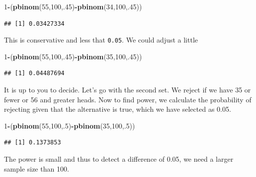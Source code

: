 \documentclass[]{book}
\newenvironment{Shaded}{\begin{snugshade}}{\end{snugshade}}
\newcommand{\KeywordTok}[1]{\textcolor[rgb]{0.13,0.29,0.53}{\textbf{#1}}}
\newcommand{\DecValTok}[1]{\textcolor[rgb]{0.00,0.00,0.81}{#1}}
\newcommand{\OperatorTok}[1]{\textcolor[rgb]{0.81,0.36,0.00}{\textbf{#1}}}
\newcommand{\NormalTok}[1]{#1}
\theoremstyle{definition}
\theoremstyle{definition}
\theoremstyle{definition}
\theoremstyle{remark}
\begin{document}
\begin{Shaded}
\begin{Highlighting}[]
\DecValTok{1}\OperatorTok{-}\NormalTok{(}\KeywordTok{pbinom}\NormalTok{(}\DecValTok{55}\NormalTok{,}\DecValTok{100}\NormalTok{,.}\DecValTok{45}\NormalTok{)}\OperatorTok{-}\KeywordTok{pbinom}\NormalTok{(}\DecValTok{34}\NormalTok{,}\DecValTok{100}\NormalTok{,.}\DecValTok{45}\NormalTok{))}
\end{Highlighting}
\end{Shaded}

\begin{verbatim}
## [1] 0.03427334
\end{verbatim}

This is conservative and less that \texttt{0.05}. We could adjust a
little

\begin{Shaded}
\begin{Highlighting}[]
\DecValTok{1}\OperatorTok{-}\NormalTok{(}\KeywordTok{pbinom}\NormalTok{(}\DecValTok{55}\NormalTok{,}\DecValTok{100}\NormalTok{,.}\DecValTok{45}\NormalTok{)}\OperatorTok{-}\KeywordTok{pbinom}\NormalTok{(}\DecValTok{35}\NormalTok{,}\DecValTok{100}\NormalTok{,.}\DecValTok{45}\NormalTok{))}
\end{Highlighting}
\end{Shaded}

\begin{verbatim}
## [1] 0.04487694
\end{verbatim}

It is up to you to decide. Let's go with the second set. We reject if we
have 35 or fewer or 56 and greater heads. Now to find power, we
calculate the probability of rejecting given that the alternative is
true, which we have selected as 0.05.

\begin{Shaded}
\begin{Highlighting}[]
\DecValTok{1}\OperatorTok{-}\NormalTok{(}\KeywordTok{pbinom}\NormalTok{(}\DecValTok{55}\NormalTok{,}\DecValTok{100}\NormalTok{,.}\DecValTok{5}\NormalTok{)}\OperatorTok{-}\KeywordTok{pbinom}\NormalTok{(}\DecValTok{35}\NormalTok{,}\DecValTok{100}\NormalTok{,.}\DecValTok{5}\NormalTok{))}
\end{Highlighting}
\end{Shaded}

\begin{verbatim}
## [1] 0.1373853
\end{verbatim}

The power is small and thus to detect a difference of 0.05, we need a
larger sample size than 100.
\end{document}
